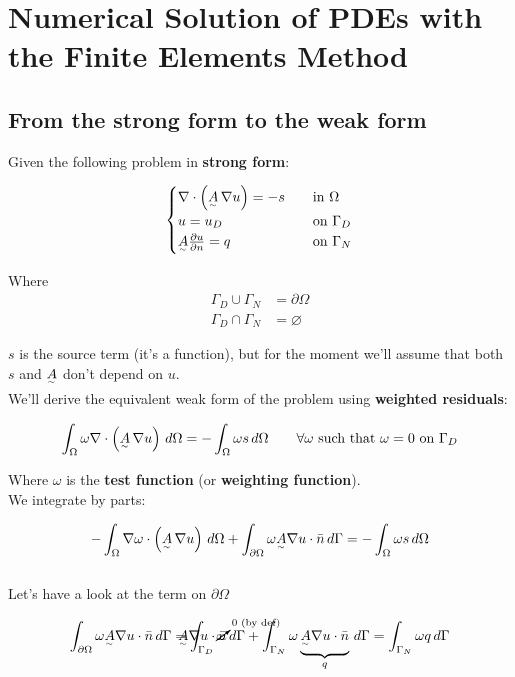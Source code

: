 \section{Numerical Solution of PDEs with the Finite Elements Method}

\subsection{From the strong form to the weak form}

Given the following problem in \textbf{strong form}: 

\[
  \begin{cases}
    \nabla\cdot\left(\underset{^\sim}{A}\,\nabla u\right) = -s \quad &\text{in }\Omega\\
    u = u_D \quad &\text{on } \Gamma_D\\
    \underset{^\sim}{A}\frac{\partial u}{\partial n} = q \quad &\text{on } \Gamma_N
  \end{cases}
\]

Where 
\begin{align*}
      \Gamma_D\cup\Gamma_N &= \partial\Omega\\
      \Gamma_D\cap\Gamma_N &= \varnothing
\end{align*}

$s$ is the source term (it's a function), but for the moment we'll assume that both $s$ and $\underset{^\sim}{A}$ don't depend on $u$. \\

We'll derive the equivalent weak form of the problem using \textbf{weighted residuals}:

\[
  \int_\Omega\omega\nabla\cdot\left(\underset{^\sim}{A}\,\nabla u\right)\,d\Omega = -\int_\Omega \omega s \, d\Omega \qquad\forall \omega \text{ such that } \omega = 0 \text{ on } \Gamma_D
\]

Where $\omega$ is the \textbf{test function} (or \textbf{weighting function}). \\

We integrate by parts:

\[
  -\int_{\Omega} \nabla\omega\cdot\left(\underset{^\sim}{A}\,\nabla u\right)\,d\Omega + \int_{\partial\Omega} \omega\underset{^\sim}{A}\nabla u\cdot\Bar{n} \,d\Gamma = -\int_\Omega \omega s \, d\Omega
\]\-\\
Let's have a look at the term on $\partial\Omega$

\[
  \int_{\partial\Omega} \omega\subTilde{A}\nabla u\cdot\Bar{n} \,d\Gamma = \int_{\Gamma_D} \cancelto{^{\footnotesize{\scriptstyle{0} \text{ (by def)}}}}{\omega} \hspace{-1.2cm}\subTilde{A}\nabla u\cdot\Bar{n} \,d\Gamma + \int_{\Gamma_N} \omega\underbrace{\subTilde{A}\nabla u\cdot\Bar{n}}_{q} \,d\Gamma = \int_{\Gamma_N} \omega q \, d\Gamma
\]

